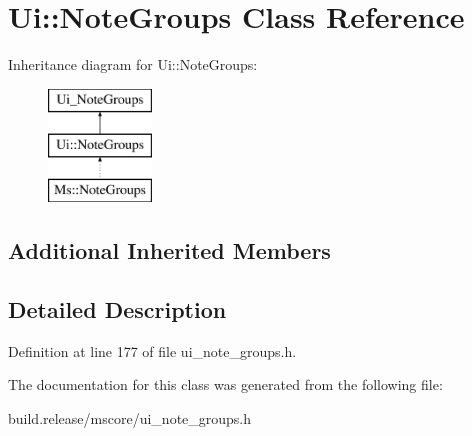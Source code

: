 \hypertarget{class_ui_1_1_note_groups}{}\section{Ui\+:\+:Note\+Groups Class Reference}
\label{class_ui_1_1_note_groups}
Inheritance diagram for Ui\+:\+:Note\+Groups\+:\begin{figure}[H]
\begin{center}
\leavevmode
\includegraphics[height=3.000000cm]{class_ui_1_1_note_groups}
\end{center}
\end{figure}
\subsection*{Additional Inherited Members}


\subsection{Detailed Description}


Definition at line 177 of file ui\+\_\+note\+\_\+groups.\+h.



The documentation for this class was generated from the following file\+:\begin{DoxyCompactItemize}
\item 
build.\+release/mscore/ui\+\_\+note\+\_\+groups.\+h\end{DoxyCompactItemize}
